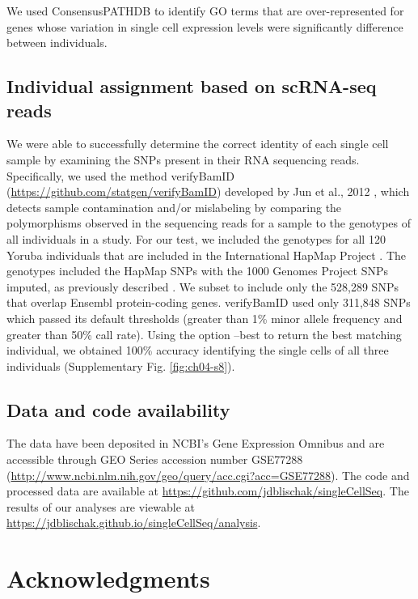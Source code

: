 We used ConsensusPATHDB \citep{Kamburov2011} to identify GO terms that
are over-represented for genes whose variation in single cell
expression levels were significantly difference between individuals.

\subsection{Individual assignment based on scRNA-seq
reads}\label{individual-assignment-based-on-scrna-seq-reads}

We were able to successfully determine the correct identity of each
single cell sample by examining the SNPs present in their RNA
sequencing reads. Specifically, we used the method verifyBamID
(\url{https://github.com/statgen/verifyBamID}) developed by Jun et
al., 2012 \citep{Jun2012}, which detects sample contamination and/or
mislabeling by comparing the polymorphisms observed in the sequencing
reads for a sample to the genotypes of all individuals in a study. For
our test, we included the genotypes for all 120 Yoruba individuals
that are included in the International HapMap Project
\citep{HapMapConsortium2005}. The genotypes included the HapMap SNPs
with the 1000 Genomes Project SNPs \citep{OneKGConsortium2012}
imputed, as previously described \citep{McVicker2013}. We subset to
include only the 528,289 SNPs that overlap Ensembl protein-coding
genes. verifyBamID used only 311,848 SNPs which passed its default
thresholds (greater than 1\% minor allele frequency and greater than
50\% call rate). Using the option --best to return the best matching
individual, we obtained 100\% accuracy identifying the single cells of
all three individuals (Supplementary Fig. \ref{fig:ch04-s8}).

\subsection{Data and code
availability}\label{ch04-data-and-code-availability}

The data have been deposited in NCBI's Gene Expression Omnibus
\citep{Edgar2002} and are accessible through GEO Series accession
number GSE77288
(\url{http://www.ncbi.nlm.nih.gov/geo/query/acc.cgi?acc=GSE77288}). The
code and processed data are available at
\url{https://github.com/jdblischak/singleCellSeq}. The results of our
analyses are viewable at
\url{https://jdblischak.github.io/singleCellSeq/analysis}.

\section{Acknowledgments}\label{ch04-acknowledgments}

